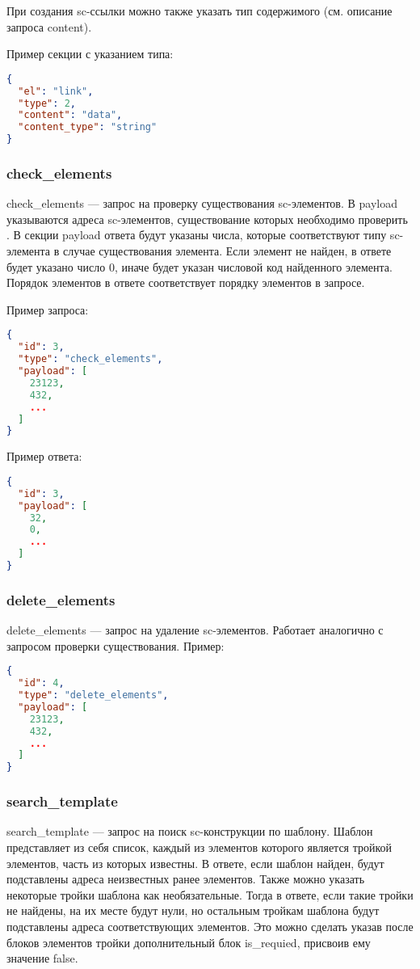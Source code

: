 При создания sc-ссылки можно также указать тип содержимого (см. описание запроса content). 

Пример секции с указанием типа:
\begin{lstlisting}[language=json,firstnumber=1]
{
  "el": "link",
  "type": 2,         
  "content": "data", 
  "content_type": "string"  
}
\end{lstlisting}

\subsubsection{check\_elements}
check\_elements --- запрос на проверку существования sc-элементов. В payload указываются адреса sc-элементов, существование которых необходимо проверить . В секции payload ответа будут указаны числа, которые соответствуют типу sc-элемента в случае существования элемента. Если элемент не найден, в ответе будет указано число 0, иначе будет указан числовой код найденного элемента. Порядок элементов в ответе соответствует порядку элементов в запросе.

Пример  запроса:
\begin{lstlisting}[language=json,firstnumber=1]
{
  "id": 3,
  "type": "check_elements",
  "payload": [
    23123,
    432,
    ...
  ]
}
\end{lstlisting}

Пример ответа: 
\begin{lstlisting}[language=json,firstnumber=1]
{
  "id": 3,
  "payload": [
    32, 
    0,  
    ...
  ]
}

\end{lstlisting}

\subsubsection{delete\_elements}
delete\_elements --- запрос на удаление sc-элементов. Работает аналогично с запросом проверки существования.
Пример:
\begin{lstlisting}[language=json,firstnumber=1]
{
  "id": 4,
  "type": "delete_elements",
  "payload": [
    23123,
    432,
    ...
  ]
}
\end{lstlisting}

\subsubsection{search\_template}
search\_template --- запрос на поиск sc-конструкции по шаблону. Шаблон представляет из себя список, каждый из элементов которого является тройкой элементов, часть из которых известны. В ответе, если шаблон найден, будут подставлены адреса неизвестных ранее элементов. Также можно указать некоторые тройки шаблона как необязательные. Тогда в ответе, если такие тройки не найдены, на их месте будут нули, но остальным тройкам шаблона будут подставлены адреса соответствующих элементов. Это можно сделать указав после блоков элементов тройки дополнительный блок is\_requied, присвоив ему значение false. 


